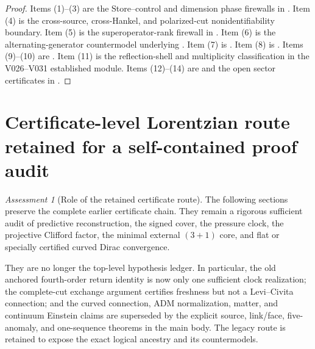 \documentclass[11pt]{article}
\theoremstyle{definition}
\theoremstyle{remark}
\newtheorem{assessment}[theorem]{Assessment}
\begin{document}
\begin{proof}
Items \textup{(1)--(3)} are the Store--control and dimension phase firewalls in
.  Item
\textup{(4)} is the cross-source, cross-Hankel, and polarized-cut
nonidentifiability boundary.  Item \textup{(5)} is the superoperator-rank
firewall in .  Item \textup{(6)} is the alternating-generator countermodel underlying
.  Item \textup{(7)} is
.  Item
\textup{(8)} is .  Items
\textup{(9)--(10)} are
.
Item \textup{(11)} is the reflection-shell and multiplicity classification in
the V026--V031 established module.  Items \textup{(12)--(14)} are
 and the open sector
certificates in .
\end{proof}

\clearpage

\section{Certificate-level Lorentzian route retained for a self-contained proof audit}

\begin{assessment}[Role of the retained certificate route]
The following sections preserve the complete earlier certificate chain.  They
remain a rigorous sufficient audit of predictive reconstruction, the signed
cover, the pressure clock, the projective Clifford factor, the minimal external
$(3+1)$ core, and flat or specially certified curved Dirac convergence.

They are no longer the top-level hypothesis ledger.  In particular, the old
anchored fourth-order return identity is now only one sufficient clock
realization; the complete-cut exchange argument certifies freshness but not a
Levi--Civita connection; and the curved connection, ADM normalization, matter,
and continuum Einstein claims are superseded by the explicit source,
link/face, five-anomaly, and one-sequence theorems in the main body.  The legacy
route is retained to expose the exact logical ancestry and its countermodels.
\end{assessment}
\end{document}
